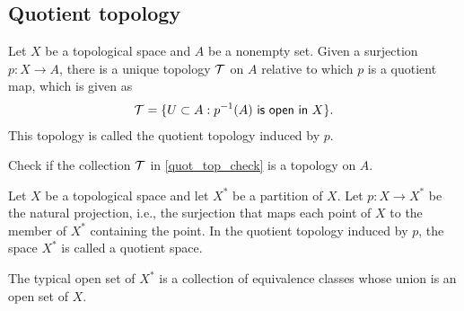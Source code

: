 \subsection{Quotient topology}

\begin{defi}
    Let $X$ be a topological space and $A$ be a nonempty set.
    Given a surjection $p: X\rightarrow A$, there is a unique topology ${\mathcal{T}}$ on $A$ relative to which $p$ is a quotient map, which is given as
    \begin{align}\label{quot_top_check}
        {\mathcal{T}}=\{U\subset A: p^{-1}(A)\textsf{ is open in }X\}.
    \end{align}
    This topology is called the quotient topology induced by $p$.
\end{defi}
\begin{prob}
    Check if the collection ${\mathcal{T}}$ in \cref{quot_top_check} is a topology on $A$.
\end{prob}
\begin{defi}
    Let $X$ be a topological space and let $X^*$ be a partition of $X$.
    Let $p: X\rightarrow X^*$ be the natural projection, i.e., the surjection that maps each point of $X$ to the member of $X^*$ containing the point.
    In the quotient topology induced by $p$, the space $X^*$ is called a quotient space.
\end{defi}
\begin{rmk}
    The typical open set of $X^*$ is a collection of equivalence classes whose union is an open set of $X$.
\end{rmk}

